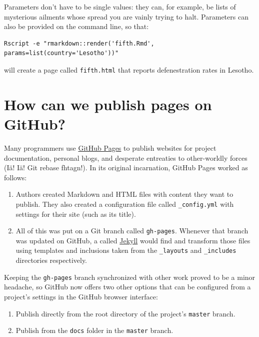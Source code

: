 Parameters don't have to be single values:
they can,
for example,
be lists of mysterious ailments whose spread you are vainly trying to halt.
Parameters can also be provided on the command line,
so that:

\begin{lstlisting}
Rscript -e "rmarkdown::render('fifth.Rmd', params=list(country='Lesotho'))"
\end{lstlisting}

\noindent
will create a page called \texttt{fifth.html} that reports defenestration rates in Lesotho.

\section{How can we publish pages on GitHub?}

Many programmers use \href{https://pages.github.com/}{GitHub Pages} to publish websites
for project documentation,
personal blogs,
and desperate entreaties to other-worldly forces
(Iä! Iä! Git rebase fhtagn!).
In its original incarnation,
GitHub Pages worked as follows:

\begin{enumerate}
\item
  Authors created Markdown and HTML files with content they want to publish.
  They also created a configuration file called \texttt{\_config.yml}
  with settings for their site (such as its title).
\item
  All of this was put on a Git branch called \texttt{gh-pages}.
  Whenever that branch was updated on GitHub,
  a  called \href{https://jekyllrb.com/}{Jekyll}
  would find and transform those files
  using templates and inclusions taken from the \texttt{\_layouts} and \texttt{\_includes} directories respectively.
\end{enumerate}

\noindent
Keeping the \texttt{gh-pages} branch synchronized with other work proved to be a minor headache,
so GitHub now offers two other options
that can be configured from a project's settings in the GitHub browser interface:

\begin{enumerate}
\item
  Publish directly from the root directory of the project's \texttt{master} branch.
\item
  Publish from the \texttt{docs} folder in the \texttt{master} branch.
\end{enumerate}

